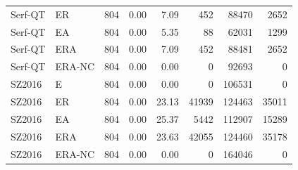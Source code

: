 \begin{table}[t]
\begin{tabular}{@{}llrrrrrr@{}}
Serf-QT & ER & 804 & 0.00 & 7.09 & 452 & 88470 & 2652 \\
Serf-QT & EA & 804 & 0.00 & 5.35 & 88 & 62031 & 1299 \\
Serf-QT & ERA & 804 & 0.00 & 7.09 & 452 & 88481 & 2652 \\
Serf-QT & ERA-NC & 804 & 0.00 & 0.00 & 0 & 92693 & 0 \\
SZ2016 & E & 804 & 0.00 & 0.00 & 0 & 106531 & 0 \\
SZ2016 & ER & 804 & 0.00 & 23.13 & 41939 & 124463 & 35011 \\
SZ2016 & EA & 804 & 0.00 & 25.37 & 5442 & 112907 & 15289 \\
SZ2016 & ERA & 804 & 0.00 & 23.63 & 42055 & 124460 & 35178 \\
SZ2016 & ERA-NC & 804 & 0.00 & 0.00 & 0 & 164046 & 0 \\
\bottomrule
\end{tabular}
\end{table}

